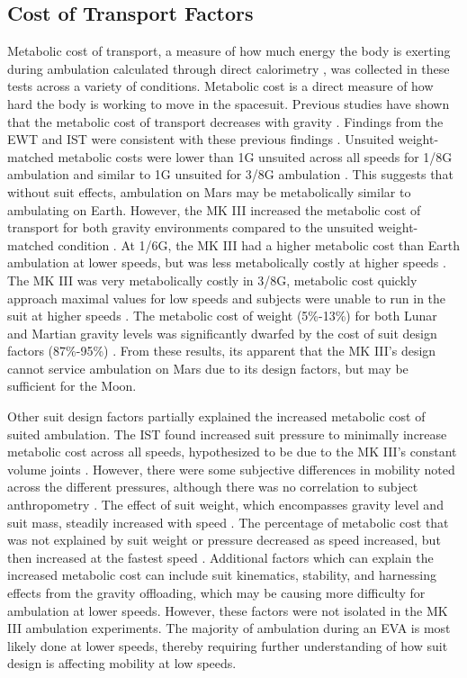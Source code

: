 \documentclass[defaultstyle,11pt]{thesis}
\begin{document}
\hypertarget{cost-of-transport-factors}{%
\subsection{Cost of Transport Factors}\label{cost-of-transport-factors}}

Metabolic cost of transport, a measure of how much energy the body is exerting during ambulation calculated through direct calorimetry \citep{Kenny2017}, was collected in these tests across a variety of conditions.
Metabolic cost is a direct measure of how hard the body is working to move in the spacesuit.
Previous studies have shown that the metabolic cost of transport decreases with gravity \citep{Grabowski2005}.
Findings from the EWT and IST were consistent with these previous findings \citep{Norcross2009, Norcross2010}.
Unsuited weight-matched metabolic costs were lower than 1G unsuited across all speeds for 1/8G ambulation and similar to 1G unsuited for 3/8G ambulation \citep{Norcross2009}.
This suggests that without suit effects, ambulation on Mars may be metabolically similar to ambulating on Earth.
However, the MK III increased the metabolic cost of transport for both gravity environments compared to the unsuited weight-matched condition \citep{Norcross2009}.
At 1/6G, the MK III had a higher metabolic cost than Earth ambulation at lower speeds, but was less metabolically costly at higher speeds \citep{Norcross2009, Norcross2010}.
The MK III was very metabolically costly in 3/8G, metabolic cost quickly approach maximal values for low speeds and subjects were unable to run in the suit at higher speeds \citep{Norcross2009}.
The metabolic cost of weight (5\%-13\%) for both Lunar and Martian gravity levels was significantly dwarfed by the cost of suit design factors (87\%-95\%) \citep{Norcross2009}.
From these results, its apparent that the MK III's design cannot service ambulation on Mars due to its design factors, but may be sufficient for the Moon.

Other suit design factors partially explained the increased metabolic cost of suited ambulation.
The IST found increased suit pressure to minimally increase metabolic cost across all speeds, hypothesized to be due to the MK III's constant volume joints \citep{Norcross2010}.
However, there were some subjective differences in mobility noted across the different pressures, although there was no correlation to subject anthropometry \citep{Norcross2010}.
The effect of suit weight, which encompasses gravity level and suit mass, steadily increased with speed \citep{Norcross2010}.
The percentage of metabolic cost that was not explained by suit weight or pressure decreased as speed increased, but then increased at the fastest speed \citep{Norcross2010}.
Additional factors which can explain the increased metabolic cost can include suit kinematics, stability, and harnessing effects from the gravity offloading, which may be causing more difficulty for ambulation at lower speeds.
However, these factors were not isolated in the MK III ambulation experiments.
The majority of ambulation during an EVA is most likely done at lower speeds, thereby requiring further understanding of how suit design is affecting mobility at low speeds.
\end{document}
